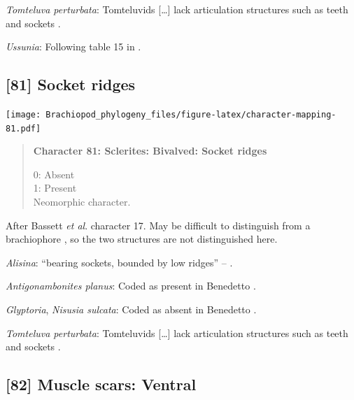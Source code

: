 \documentclass[openany]{book}
\begin{document}
\hypertarget{Tomteluva_perturbata-coding-80}{}
\emph{Tomteluva perturbata}: Tomteluvids {[}\ldots{}{]} lack
articulation structures such as teeth and sockets
\citep{Streng2016Anew}.

\hypertarget{Ussunia-coding-80}{}
\emph{Ussunia}: Following table 15 in
\citet{Williams2000LinguliformeaCraniiformea}.

\subsection*{{[}81{]} Socket ridges}\label{socket-ridges}

\texttt{[image: Brachiopod\_phylogeny\_files/figure-latex/character-mapping-81.pdf]}

\begin{quote}
\textbf{Character 81: Sclerites: Bivalved: Socket ridges}

0: Absent\\
1: Present\\
Neomorphic character.
\end{quote}

After Bassett \emph{et al}.
\citeyearpar{Bassett2001Functionalmorphology} character 17. May be
difficult to distinguish from a brachiophore \citep[see Fig 323
in][]{Williams1997Introduction}, so the two structures are not
distinguished here.

\hypertarget{Alisina-coding-81}{}
\emph{Alisina}: ``bearing sockets, bounded by low ridges'' --
\citet{Williams2000LinguliformeaCraniiformea}.

\hypertarget{Antigonambonites_planus-coding-81}{}
\emph{Antigonambonites planus}: Coded as present in Benedetto
\citeyearpar{Benedetto2009iChaniella}.

\hypertarget{Glyptoria-coding-81}{}
\emph{Glyptoria}, \emph{Nisusia sulcata}: Coded as absent in Benedetto
\citeyearpar{Benedetto2009iChaniella}.

\hypertarget{Tomteluva_perturbata-coding-81}{}
\emph{Tomteluva perturbata}: Tomteluvids {[}\ldots{}{]} lack
articulation structures such as teeth and sockets
\citep{Streng2016Anew}.

\subsection*{{[}82{]} Muscle scars: Ventral}\label{muscle-scars-ventral}
\end{document}
